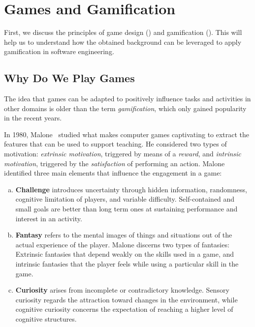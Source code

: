 \section{Games and Gamification} \label{sec:principles}

First, we discuss the principles of game design () and gamification ().
This will help us to understand how the obtained background can be leveraged to apply gamification in software engineering.

\subsection{Why Do We Play Games} \label{sec:principles:games}

The  idea that games can be adapted to positively influence tasks and activities in other domains is older than the term \emph{gamification}, which only gained popularity in the recent years.

In 1980, Malone~\cite{Malone1980} studied what makes computer games captivating to extract the features that can be used to support teaching.
He considered two types of motivation: \emph{extrinsic motivation}, triggered by means of a {\em reward}, and \emph{intrinsic motivation}, triggered by the {\em satisfaction} of performing an action.
Malone identified three main elements that influence the engagement in a game:

\begin{enumerate}[(a)]

\item\textbf{Challenge} introduces uncertainty through hidden information, randomness, cognitive limitation of players, and variable difficulty.
Self-contained and small goals are better than long term ones at sustaining performance and interest in an activity.

\item\textbf{Fantasy} refers to the mental images of things and situations out of the actual experience of the player.
Malone discerns two types of fantasies: Extrinsic fantasies that depend weakly on the skills used in a game, and intrinsic fantasies that the player feels while using a particular skill in the game.

\item\textbf{Curiosity} arises from incomplete or contradictory knowledge.
Sensory curiosity regards the attraction toward changes in the environment, while cognitive curiosity concerns the expectation of reaching a higher level of cognitive structures.

\end{enumerate}

